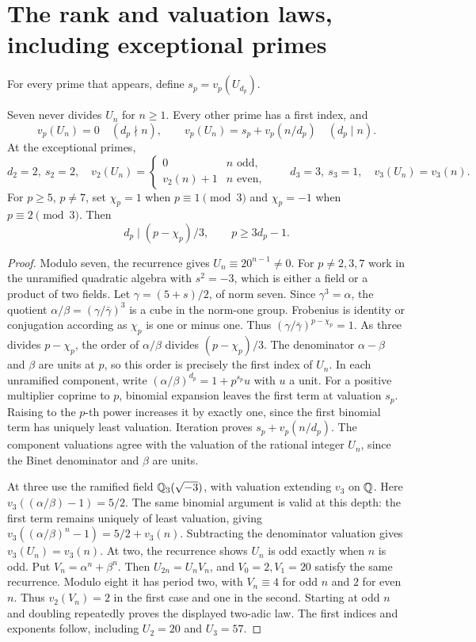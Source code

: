 \section{The rank and valuation laws, including exceptional primes}
For every prime that appears, define $s_p=v_p(U_{d_p})$.
\begin{theorem}\label{rank:thm:local}
Seven never divides $U_n$ for $n\ge1$. Every other prime has a first index, and
\[
 v_p(U_n)=0\quad(d_p\nmid n),\qquad
 v_p(U_n)=s_p+v_p(n/d_p)\quad(d_p\mid n).
\]
At the exceptional primes,
\[
 d_2=2,\ s_2=2,\quad
 v_2(U_n)=\begin{cases}0&n\text{ odd},\\v_2(n)+1&n\text{ even},\end{cases}
 \qquad d_3=3,\ s_3=1,\quad v_3(U_n)=v_3(n).
\]
For $p\ge5$, $p\ne7$, set $\chi_p=1$ when $p\equiv1\pmod3$ and $\chi_p=-1$ when $p\equiv2\pmod3$. Then
\[
 d_p\mid(p-\chi_p)/3,\qquad p\ge3d_p-1.
\]
\end{theorem}
\begin{proof}
Modulo seven, the recurrence gives $U_n\equiv20^{n-1}\ne0$. For $p\ne2,3,7$ work in the unramified quadratic algebra with $s^2=-3$, which is either a field or a product of two fields. Let $\gamma=(5+s)/2$, of norm seven. Since $\gamma^3=\alpha$, the quotient $\alpha/\beta=(\gamma/\bar\gamma)^3$ is a cube in the norm-one group. Frobenius is identity or conjugation according as $\chi_p$ is one or minus one. Thus $(\gamma/\bar\gamma)^{p-\chi_p}=1$. As three divides $p-\chi_p$, the order of $\alpha/\beta$ divides $(p-\chi_p)/3$. The denominator $\alpha-\beta$ and $\beta$ are units at $p$, so this order is precisely the first index of $U_n$.
In each unramified component, write $(\alpha/\beta)^{d_p}=1+p^{s_p}u$ with $u$ a unit. For a positive multiplier coprime to $p$, binomial expansion leaves the first term at valuation $s_p$. Raising to the $p$-th power increases it by exactly one, since the first binomial term has uniquely least valuation. Iteration proves $s_p+v_p(n/d_p)$. The component valuations agree with the valuation of the rational integer $U_n$, since the Binet denominator and $\beta$ are units.

At three use the ramified field $\mathbb Q_3(\sqrt{-3})$, with valuation extending $v_3$ on $\mathbb Q$. Here $v_3((\alpha/\beta)-1)=5/2$. The same binomial argument is valid at this depth: the first term remains uniquely of least valuation, giving $v_3((\alpha/\beta)^n-1)=5/2+v_3(n)$. Subtracting the denominator valuation gives $v_3(U_n)=v_3(n)$.
At two, the recurrence shows $U_n$ is odd exactly when $n$ is odd. Put $V_n=\alpha^n+\beta^n$. Then $U_{2n}=U_nV_n$, and $V_0=2,V_1=20$ satisfy the same recurrence. Modulo eight it has period two, with $V_n\equiv4$ for odd $n$ and $2$ for even $n$. Thus $v_2(V_n)=2$ in the first case and one in the second. Starting at odd $n$ and doubling repeatedly proves the displayed two-adic law. The first indices and exponents follow, including $U_2=20$ and $U_3=57$.
\end{proof}

